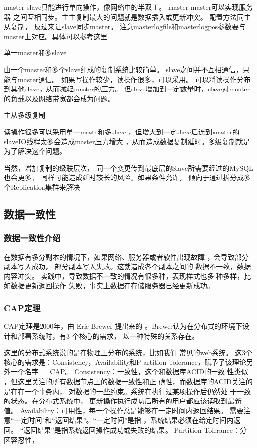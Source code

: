 master-slave只能进行单向操作，像网络中的半双工。
master-master可以实现服务器
之间互相同步。主主复制最大的问题就是数据插入或更新冲突。
配置方法同主从复制，
反过来让slave同步master。
注意masterlogfile和masterlogpos参数要与master上对应。具体可以参考这里

单一master和多slave

由一个master和多个slave组成的复制系统比较简单。
slave之间并不互相通信，只能与master通信。
如果写操作较少，读操作很多，可以采用。
可以将读操作分布到其他slave，从而减轻master的压力。
但slave增加到一定数量时，slave对master的负载以及网络带宽都会成为问题。

主从多级复制

读操作很多可以采用单一maste和多slave
，但增大到一定slave后连到master的slaveIO线程太多会造成master压力增大
，从而造成数据复制延时。多级复制就是为了解决这个问题。

当然，增加复制的级联层次，
同一个变更传到最底层的Slave所需要经过的MySQL也会更多，
同样可能造成延时较长的风险。如果条件允许，
倾向于通过拆分成多个Replication集群来解决
\subsection*{数据一致性}
\subsubsection*{数据一致性介绍}
在数据有多分副本的情况下，如果网络、服务器或者软件出现故障
，会导致部分副本写入成功，
部分副本写入失败。这就造成各个副本之间的
数据不一致，数据内容冲突。 
实践中，导致数据不一致的情况有很多种，表现样式也多
种多样，比如数据更新返回操作
失败，事实上数据在存储服务器已经更新成功。
\subsubsection*{CAP定理}
CAP定理是2000年，由 Eric Brewer 提出来的
。Brewer认为在分布式的环境下设计和部署系统时，有3
个核心的需求，
以一种特殊的关系存在。

这里的分布式系统说的是在物理上分布的系统，比如我们
常见的web系统。
这3个核心的需求是：Consistency，Availability和P
artition Tolerance，赋予了该理论另外一个名字 － CAP。
Consistency：一致性，这个和数据库ACID的一致
性类似
，但这里关注的所有数据节点上的数据一致性和正
确性，而数据库的ACID关注的是在在一个事务内，
对数据的一些约束。系统在执行过某项操作后仍然处
于一致的状态。在分布式系统中，
更新操作执行成功后所有的用户都应该读取到最新值。
Availability：可用性，每一个操作总是能够在一定时间内返回结果。
需要注意“一定时间”和“返回结果”。“一定时间”是指
，系统结果必须在给定时间内返回。
“返回结果”是指系统返回操作成功或失败的结果。
Partition Tolerance：分区容忍性，

